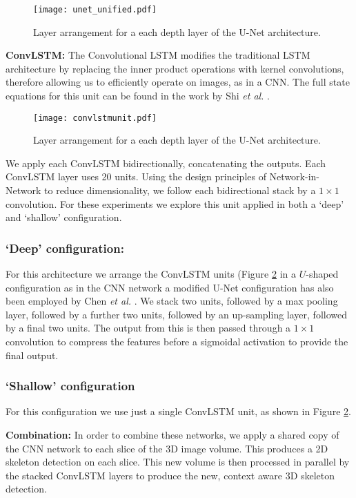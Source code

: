 \documentclass[journal,transmag]{IEEEtran}
\begin{document}
\begin{figure}
\centering
\texttt{[image: unet\_unified.pdf]}
\caption{Layer arrangement for a each depth layer of the U-Net architecture.}
\label{fig:unetfull}
\end{figure}

\textbf{ConvLSTM:} The Convolutional LSTM modifies the traditional LSTM architecture \cite{Hochreiter1997} by replacing the inner product operations with kernel convolutions, therefore allowing us to efficiently operate on images, as in a CNN. The full state equations for this unit can be found in the work by Shi \emph{et al.} \cite{SHI2015}.


\begin{figure}[t]
\centering
\texttt{[image: convlstmunit.pdf]}
\caption{Layer arrangement for a each depth layer of the U-Net architecture. }
\label{fig:convlstmunit}
\end{figure}

We apply each ConvLSTM bidirectionally, concatenating the outputs. Each ConvLSTM layer uses 20 units. Using the design principles of Network-in-Network \cite{Lin2013} to reduce dimensionality, we follow each bidirectional stack by a $1\times1$ convolution. For these experiments we explore this unit applied in both a `deep' and `shallow' configuration.
\subsubsection{`Deep' configuration:}
\label{sec:deep_clstm}
For this architecture we arrange the ConvLSTM units (Figure \ref{fig:convlstmunit} in a $U$-shaped configuration as in the CNN network a modified U-Net configuration has also been employed by Chen \emph{et al.} \cite{Chen2016}. We stack two units, followed by a max pooling layer, followed by a further two units, followed by an up-sampling layer, followed by a final two units. The output from this is then passed through a $1\times1$ convolution to compress the features before a sigmoidal activation to provide the final output.
\subsubsection{`Shallow' configuration}
\label{sec:shallow_clstm}
For this configuration we use just a single ConvLSTM unit, as shown in Figure \ref{fig:convlstmunit}.

\textbf{Combination: } In order to combine these networks, we apply a shared copy of the CNN network to each slice of the 3D image volume. This produces a 2D skeleton detection on each slice. This new volume is then processed in parallel by the stacked ConvLSTM layers to produce the new, context aware 3D skeleton detection.
\end{document}
